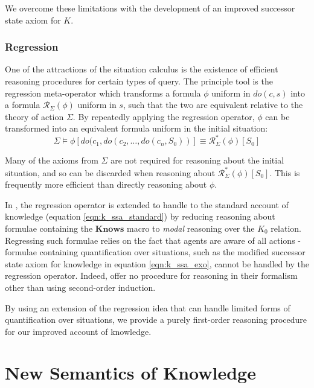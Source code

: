 \documentclass[letterpaper]{article}
\begin{document}
We overcome these limitations with the development of an improved
successor state axiom for $K$.


\subsubsection{Regression}

One of the attractions of the situation calculus is the existence
of efficient reasoning procedures for certain types of query. The
principle tool is the regression meta-operator \cite{reiter91frameprob}
which transforms a formula $\phi$ uniform in $do(c,s)$ into a formula
$\mathcal{R}_{\Sigma}(\phi)$ uniform in $s$, such that the two are
equivalent relative to the theory of action $\Sigma$. By repeatedly
applying the regression operator, $\phi$ can be transformed into
an equivalent formula uniform in the initial situation:\begin{equation*}
\Sigma\models\phi[do(c_{1},do(c_{2},\dots,do(c_{n},S_{0}))]\equiv\mathcal{R}_{\Sigma}^{*}(\phi)[S_{0}]\end{equation*}

Many of the axioms from $\Sigma$ are not required for reasoning about
the initial situation, and so can be discarded when reasoning about
$\mathcal{R}_{\Sigma}^{*}(\phi)[S_{0}]$. This is frequently more
efficient than directly reasoning about $\phi$.

In \cite{scherl03sc_knowledge}, the regression operator is extended
to handle to the standard account of knowledge (equation \ref{eqn:k_ssa_standard})
by reducing reasoning about formulae containing the $\mathbf{Knows}$
macro to \emph{modal} reasoning over the $K_{0}$ relation. Regressing
such formulae relies on the fact that agents are aware of all actions
- formulae containing quantification over situations, such as the
modified successor state axiom for knowledge in equation \ref{eqn:k_ssa_exo},
cannot be handled by the regression operator. Indeed, \cite{Lesperance99sitcalc_approach}
offer no procedure for reasoning in their formalism other than using
second-order induction.

By using an extension of the regression idea that can handle limited
forms of quantification over situations, we provide a purely first-order
reasoning procedure for our improved account of knowledge.


\section{New Semantics of Knowledge\label{sec:New-Semantics}}
\end{document}
